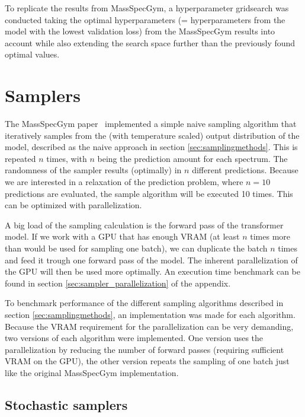 To replicate the results from MassSpecGym, a hyperparameter gridsearch was conducted taking the optimal hyperparameters (= hyperparameters from the model with the lowest validation loss) from the MassSpecGym results into account
while also extending the search space further than the previously found optimal values.


\section{Samplers}
\label{sec:samplers}

The MassSpecGym paper~\cite{bushuiev2024massspecgym} implemented a simple naive sampling algorithm that iteratively samples from the (with temperature scaled) output distribution of the model, described as the naive approach in section \ref{sec:samplingmethods}.
This is repeated $n$ times, with $n$ being the prediction amount for each spectrum. The randomness of the sampler results (optimally) in $n$ different predictions.
Because we are interested in a relaxation of the prediction problem, where $n=10$ predictions are evaluated, the sample algorithm will be executed 10 times. This can be optimized with parallelization.

A big load of the sampling calculation is the forward pass of the transformer model. 
If we work with a GPU that has enough VRAM (at least $n$ times more than would be used for sampling one batch),
we can duplicate the batch $n$ times and feed it trough one forward pass of the model. The inherent parallelization of the GPU will then be used more optimally.
An execution time benchmark can be found in section \ref{sec:sampler_parallelization} of the appendix.

To benchmark performance of the different sampling algorithms described in section \ref{sec:samplingmethods}, an implementation was made for each algorithm.
Because the VRAM requirement for the parallelization can be very demanding, two versions of each algorithm were implemented. 
One version uses the parallelization by reducing the number of forward passes (requiring sufficient VRAM on the GPU), the other version repeats the sampling of one batch just like the original MassSpecGym implementation.

\subsection{Stochastic samplers}

